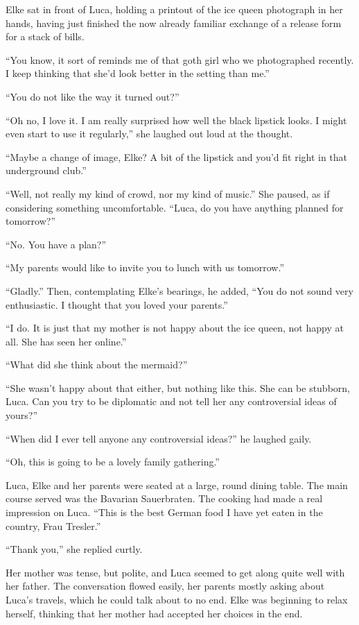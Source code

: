 \sectionline

Elke sat in front of Luca, holding a printout of the ice queen photograph in her hands, having just finished the now already familiar exchange of a release form for a stack of bills.

``You know, it sort of reminds me of that goth girl who we photographed recently. I keep thinking that she'd look better in the setting than me.''

``You do not like the way it turned out?''

``Oh no, I love it. I am really surprised how well the black lipstick looks. I might even start to use it regularly,'' she laughed out loud at the thought.

``Maybe a change of image, Elke? A bit of the lipstick and you'd fit right in that underground club.''

``Well, not really my kind of crowd, nor my kind of music.'' She paused, as if considering something uncomfortable. ``Luca, do you have anything planned for tomorrow?''

``No. You have a plan?''

``My parents would like to invite you to lunch with us tomorrow.''

``Gladly.'' Then, contemplating Elke's bearings, he added, ``You do not sound very enthusiastic. I thought that you loved your parents.''

``I do. It is just that my mother is not happy about the ice queen, not happy at all. She has seen her online.''

``What did she think about the mermaid?''

``She wasn't happy about that either, but nothing like this. She can be stubborn, Luca. Can you try to be diplomatic and not tell her any controversial ideas of yours?''

``When did I ever tell anyone any controversial ideas?'' he laughed gaily.

``Oh, this is going to be a lovely family gathering.''

\sectionline

Luca, Elke and her parents were seated at a large, round dining table. The main course served was the Bavarian Sauerbraten. The cooking had made a real impression on Luca. ``This is the best German food I have yet eaten in the country, Frau Tresler.''

``Thank you,'' she replied curtly.

Her mother was tense, but polite, and Luca seemed to get along quite well with her father. The conversation flowed easily, her parents mostly asking about Luca's travels, which he could talk about to no end. Elke was beginning to relax herself, thinking that her mother had accepted her choices in the end.

